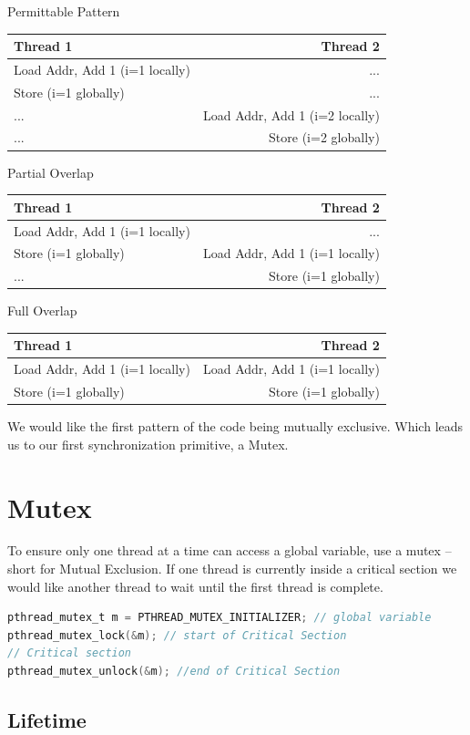 Permittable Pattern
\begin{tabular}{ l | r }
  Thread 1 & Thread 2 \\ \hline
  Load Addr, Add 1 (i=1 locally) & ...  \\
  Store (i=1 globally) & ...  \\
  ... & Load Addr, Add 1 (i=2 locally)  \\
  ... & Store (i=2 globally)  \\
\end{tabular}

Partial Overlap
\begin{tabular}{ l | r }
Thread 1 & Thread 2 \\ \hline
Load Addr, Add 1 (i=1 locally) & ... \\
Store (i=1 globally) & Load Addr, Add 1 (i=1 locally) \\
... & Store (i=1 globally) \\
\end{tabular}

Full Overlap
\begin{tabular}{ l | r }
Thread 1 & Thread 2 \\ \hline
Load Addr, Add 1 (i=1 locally) & Load Addr, Add 1 (i=1 locally) \\
Store (i=1 globally) & Store (i=1 globally) \\
\end{tabular}

We would like the first pattern of the code being mutually exclusive. Which leads us to our first synchronization primitive, a Mutex.

\section{Mutex}

To ensure only one thread at a time can access a global variable, use a mutex -- short for Mutual Exclusion. If one thread is currently inside a critical section we would like another thread to wait until the first thread is complete.

\begin{lstlisting}[language=C]
pthread_mutex_t m = PTHREAD_MUTEX_INITIALIZER; // global variable
pthread_mutex_lock(&m); // start of Critical Section
// Critical section
pthread_mutex_unlock(&m); //end of Critical Section
\end{lstlisting}

\subsection{Lifetime}

